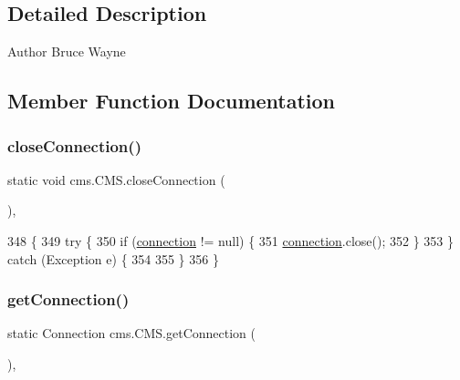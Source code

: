 \subsection{Detailed Description}
\begin{DoxyAuthor}{Author}
Bruce Wayne 
\end{DoxyAuthor}


\subsection{Member Function Documentation}
\mbox{\label{classcms_1_1_c_m_s_a8f49d9319782a9aa839dd78bb30315cf}} 
\subsubsection{\texorpdfstring{close\+Connection()}{closeConnection()}}
{\footnotesize\ttfamily static void cms.\+C\+M\+S.\+close\+Connection (\begin{DoxyParamCaption}{ }\end{DoxyParamCaption})\hspace{0.3cm}{\ttfamily [inline]}, {\ttfamily [static]}}


\begin{DoxyCode}
348                                         \{
349         \textcolor{keywordflow}{try} \{
350               \textcolor{keywordflow}{if} (\mbox{\hyperlink{classcms_1_1_c_m_s_afc28cfd2c4356509b85775219b7b1e05}{connection}} != null) \{
351                   \mbox{\hyperlink{classcms_1_1_c_m_s_afc28cfd2c4356509b85775219b7b1e05}{connection}}.close();
352               \}
353             \} \textcolor{keywordflow}{catch} (Exception e) \{ 
354 
355             \}
356     \}
\end{DoxyCode}
\mbox{\label{classcms_1_1_c_m_s_ae70f453d4704bfb9d89ddc637c52dc30}} 
\subsubsection{\texorpdfstring{get\+Connection()}{getConnection()}}
{\footnotesize\ttfamily static Connection cms.\+C\+M\+S.\+get\+Connection (\begin{DoxyParamCaption}{ }\end{DoxyParamCaption})\hspace{0.3cm}{\ttfamily [inline]}, {\ttfamily [static]}}


